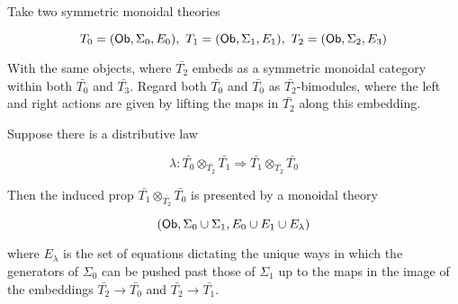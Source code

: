 \begin{lemma}[{\cite[???]{????}}]
Take two symmetric monoidal theories

$$
T_0=({\sf Ob},\Sigma_0 ,E_0 ), \ T_1=({\sf Ob},\Sigma_1 ,E_1 ),  \ T_2=({\sf Ob},\Sigma_2 ,E_3 )
$$

With the same objects, where $\bar{T_2}$ embeds as a symmetric monoidal category within both $\bar{T_0}$ and $\bar{T_3}$.  Regard both $\bar{T_0}$ and $\bar{T_0}$ as  $\bar{T_2}$-bimodules, where the left and right actions are given by lifting the maps in $\bar{T_2}$ along this embedding.

Suppose there is a distributive law

$$
\lambda:\bar{T_0}\otimes_{\bar{T_2}} \bar{T_1}\Rightarrow \bar{T_1}\otimes_{\bar{T_2}} \bar{T_0}
$$

Then the induced prop $\bar{T_1}\otimes_{\bar{T_2}} \bar{T_0}$ is presented by a monoidal theory

$$
({\sf Ob}, \Sigma_0\cup \Sigma_1, E_0\cup E_1 \cup E_\lambda)
$$

where $E_\lambda$ is the set of equations dictating the unique ways in which the generators of $\Sigma_0$ can be pushed past those of $\Sigma_1$ up to the maps in the image of the embeddings $\bar{T_2}\rightarrow \bar{T_0}$ and $\bar{T_2}\rightarrow \bar{T_1}$.
\end{lemma}



